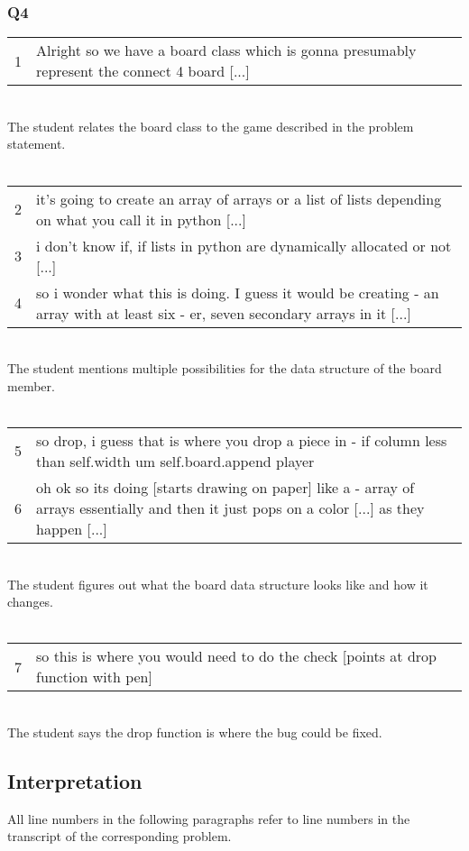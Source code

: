 \subsubsection{Q4}
\begin{tabular}{lp{13cm}}
1& Alright so we have a board class which is gonna presumably represent the connect 4 board [...]\\
\end{tabular} \\
The student relates the board class to the game described in the problem statement. \\ \\
\begin{tabular}{lp{13cm}}
2& it's going to create an array of arrays or a list of lists depending on what you call it in python [...] \\
3& i don't know if, if lists in python are dynamically allocated or not [...] \\
4& so i wonder what this is doing. I guess it would be creating - an array with at least six - er, seven secondary arrays in it [...]\\
\end{tabular}\\
The student mentions multiple possibilities for the data structure of the board member. \\ \\
\begin{tabular}{lp{13cm}}
5& so drop, i guess that is where you drop a piece in - if column less than self.width um self.board.append player \\
6&oh ok so its doing  [starts drawing on paper] like a - array of arrays essentially and then it just pops on a color [...] as they happen [...] \\
\end{tabular}\\
The student figures out what the board data structure looks like and how it changes. \\ \\
\begin{tabular}{lp{13cm}}
7&so this is where you would need to do the check [points at drop function with pen] \\
\end{tabular} \\
The student says the drop function is where the bug could be fixed.



\subsection{Interpretation}
All line numbers in the following paragraphs refer to line numbers in the transcript of the corresponding problem. \\

